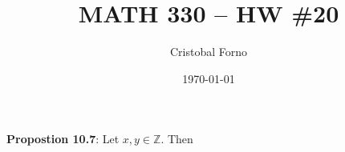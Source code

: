 \documentclass[12pt]{article}
\title{MATH 330 -- HW \#20}
\author{Cristobal Forno}
\date{\today}
\begin{document}
\maketitle

\textbf{Propostion 10.7}: Let $x, y \in \mathbb{Z}$. Then 
\end{document}
